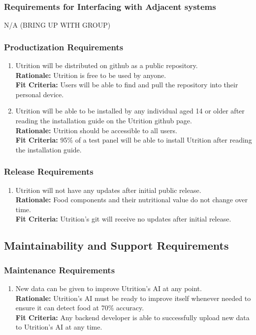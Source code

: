 \documentclass[12pt]{article}
\begin{document}
\subsubsection{Requirements for Interfacing with Adjacent systems}
\hspace{1.5cm}N/A (BRING UP WITH GROUP) 

\subsubsection{Productization Requirements}
\begin{enumerate}[start=2,label={OE\arabic*.}]
	\item Utrition will be distributed on github as a public repository.\\
	\textbf{Rationale:} Utrition is free to be used by anyone.\\
	\textbf{Fit Criteria:} Users will be able to find and pull the repository into their personal device.
	\item Utrition will be able to be installed by any individual aged 14 or older after reading the installation guide on the Utrition github page.\\
	\textbf{Rationale:} Utrition should be accessible to all users. \\
	\textbf{Fit Criteria:} 95\% of a test panel will be able to install Utrition after reading the installation guide.
\end{enumerate}

\subsubsection{Release Requirements}

\begin{enumerate}[{OE}4. ] 
	\item Utrition will not have any updates after initial public release.\\
	\textbf{Rationale:} Food components and their nutritional value do not change over time.\\	\textbf{Fit Criteria:} Utrition’s git will receive no updates after initial release.
\end{enumerate}

\subsection{Maintainability and Support Requirements}

\subsubsection{Maintenance Requirements}
\begin{enumerate}[{MS}1. ] 
	\item New data can be given to improve Utrition’s AI at any point.\\
	\textbf{Rationale:} Utrition’s AI must be ready to improve itself whenever needed to ensure it can detect food at 70\% accuracy.\\	
	\textbf{Fit Criteria:} Any backend developer is able to successfully upload new data to Utrition’s AI at any time. 
\end{enumerate}
\end{document}
